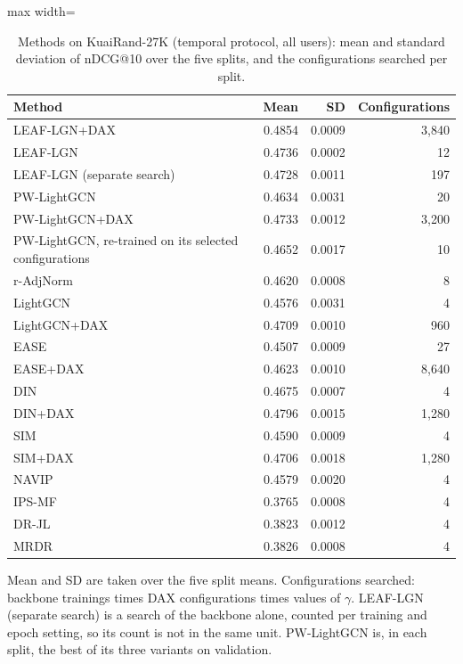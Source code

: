 \begin{table}[tbp]
\centering
\footnotesize
\caption{Methods on KuaiRand-27K (temporal protocol, all users): mean and standard deviation of nDCG@10 over the five splits, and the configurations searched per split.}
\label{tab:methods}
\begin{adjustbox}{max width=\linewidth}
\begin{tabular}{lrrr}
\toprule
Method & Mean & SD & Configurations \\
\midrule
LEAF-LGN+DAX & 0.4854 & 0.0009 & 3,840 \\
LEAF-LGN & 0.4736 & 0.0002 & 12 \\
LEAF-LGN (separate search) & 0.4728 & 0.0011 & 197 \\
PW-LightGCN & 0.4634 & 0.0031 & 20 \\
PW-LightGCN+DAX & 0.4733 & 0.0012 & 3,200 \\
PW-LightGCN, re-trained on its selected configurations & 0.4652 & 0.0017 & 10 \\
r-AdjNorm & 0.4620 & 0.0008 & 8 \\
LightGCN & 0.4576 & 0.0031 & 4 \\
LightGCN+DAX & 0.4709 & 0.0010 & 960 \\
EASE & 0.4507 & 0.0009 & 27 \\
EASE+DAX & 0.4623 & 0.0010 & 8,640 \\
DIN & 0.4675 & 0.0007 & 4 \\
DIN+DAX & 0.4796 & 0.0015 & 1,280 \\
SIM & 0.4590 & 0.0009 & 4 \\
SIM+DAX & 0.4706 & 0.0018 & 1,280 \\
NAVIP & 0.4579 & 0.0020 & 4 \\
IPS-MF & 0.3765 & 0.0008 & 4 \\
DR-JL & 0.3823 & 0.0012 & 4 \\
MRDR & 0.3826 & 0.0008 & 4 \\
\bottomrule
\end{tabular}
\end{adjustbox}
\par\smallskip
\begin{minipage}{\linewidth}\raggedright\footnotesize Mean and SD are taken over the five split means. Configurations searched: backbone trainings times DAX configurations times values of $\gamma$. LEAF-LGN (separate search) is a search of the backbone alone, counted per training and epoch setting, so its count is not in the same unit. PW-LightGCN is, in each split, the best of its three variants on validation. \end{minipage}
\end{table}
